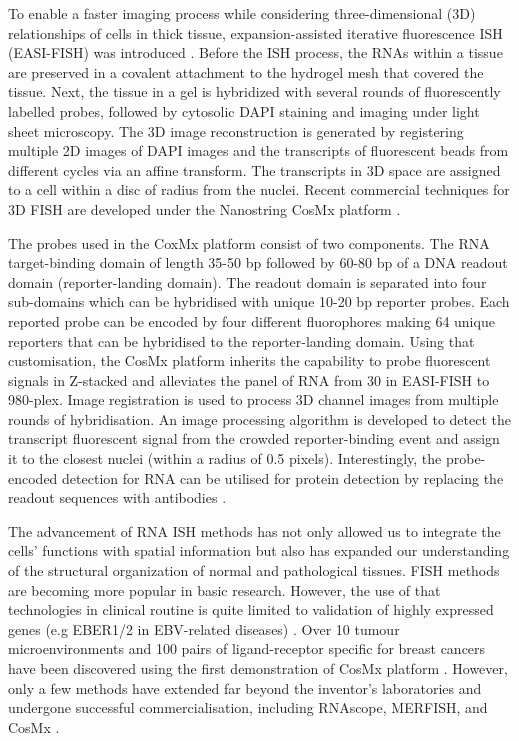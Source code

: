 To enable a faster imaging process while considering three-dimensional (3D) relationships of cells in thick tissue, expansion-assisted iterative fluorescence ISH (EASI-FISH) was introduced \cite{wang2021easi, borm2022scalable}. Before the ISH process, the RNAs within a tissue are preserved in a covalent attachment to the hydrogel mesh that covered the tissue. Next, the tissue in a gel is hybridized with several rounds of fluorescently labelled probes, followed by cytosolic DAPI staining and imaging under light sheet microscopy. The 3D image reconstruction is generated by registering multiple 2D images of DAPI images and the transcripts of fluorescent beads from different cycles via an affine transform. The transcripts in 3D space are assigned to a cell within a disc of radius from the nuclei. Recent commercial techniques for 3D FISH are developed under the Nanostring CosMx platform \cite{he2022high}.  

The probes used in the CoxMx platform consist of two components. The RNA target-binding domain of length 35-50 bp followed by 60-80 bp of a DNA readout domain (reporter-landing domain). The readout domain is separated into four sub-domains which can be hybridised with unique 10-20 bp reporter probes. Each reported probe can be encoded by four different fluorophores making 64 unique reporters that can be hybridised to the reporter-landing domain. Using that customisation, the CosMx platform inherits the capability to probe fluorescent signals in Z-stacked and alleviates the panel of RNA from 30 in EASI-FISH to 980-plex. Image registration is used to process 3D channel images from multiple rounds of hybridisation. An image processing algorithm is developed to detect the transcript fluorescent signal from the crowded reporter-binding event and assign it to the closest nuclei (within a radius of 0.5 pixels). Interestingly, the probe-encoded detection for RNA can be utilised for protein detection by replacing the readout sequences with antibodies \cite{he2022high}.   

The advancement of RNA ISH methods has not only allowed us to integrate the cells' functions with spatial information but also has expanded our understanding of the structural organization of normal and pathological tissues. FISH methods are becoming more popular in basic research. However, the use of that technologies in clinical routine is quite limited to validation of highly expressed genes (e.g EBER1/2 in EBV-related diseases) \cite{gulley2001molecular}. Over 10 tumour microenvironments  and 100 pairs of ligand-receptor specific for breast cancers have been discovered using the first demonstration of CosMx platform \cite{he2022high}. However, only a few methods have extended far beyond the inventor's laboratories and undergone successful commercialisation, including RNAscope, MERFISH, and CosMx \cite{conrad2022single}. 

